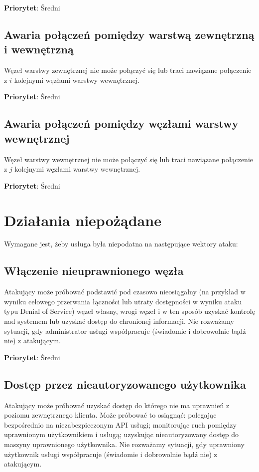 \documentclass[a4paper,11pt]{article}
\begin{document}
\textbf{Priorytet}: Średni

\subsection{Awaria połączeń pomiędzy warstwą zewnętrzną i wewnętrzną}
Węzeł warstwy zewnętrznej nie może połączyć się lub traci nawiązane
połączenie z $i$ kolejnymi węzłami warstwy wewnętrznej.

\textbf{Priorytet}: Średni

\subsection{Awaria połączeń pomiędzy węzłami warstwy wewnętrznej}
Węzeł warstwy wewnętrznej nie może połączyć się lub traci nawiązane
połączenie z $j$ kolejnymi węzłami warstwy wewnętrznej.

\textbf{Priorytet}: Średni


\section{Działania niepożądane}
Wymagane jest, żeby usługa była niepodatna na następujące wektory ataku:

\subsection{Włączenie nieuprawnionego węzła}
Atakujący może próbować podstawić pod czasowo nieosiągalny (na przykład
w wyniku celowego przerwania łączności lub utraty dostępności w wyniku
ataku typu Denial of Service) węzeł własny, wrogi węzeł i w ten sposób
uzyskać kontrolę nad systemem lub uzyskać dostęp do chronionej
informacji. Nie rozważamy sytuacji, gdy administrator usługi
współpracuje (świadomie i dobrowolnie bądź nie) z atakującym.

\textbf{Priorytet}: Średni

\subsection{Dostęp przez nieautoryzowanego użytkownika}
Atakujący może próbować uzyskać dostęp do którego nie ma uprawnień z
poziomu zewnętrznego klienta. Może próbować to osiągnąć: polegając
bezpośrednio na niezabezpieczonym API usługi; monitorując ruch pomiędzy
uprawnionym użytkownikiem i usługą; uzyskując nieautoryzowany dostęp do
maszyny uprawnionego użytkownika. Nie rozważamy sytuacji, gdy uprawniony
użytkownik usługi współpracuje (świadomie i dobrowolnie bądź nie) z
atakującym.
\end{document}

